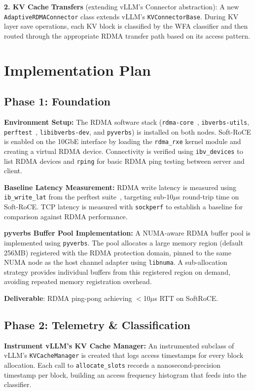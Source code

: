 \documentclass[10pt,letterpaper]{article}
\begin{document}
\textbf{2. KV Cache Transfers} (extending vLLM's Connector abstraction): A new \texttt{AdaptiveRDMAConnector} class extends vLLM's \texttt{KVConnectorBase}. During KV layer save operations, each KV block is classified by the WFA classifier and then routed through the appropriate RDMA transfer path based on its access pattern.

\section{Implementation Plan}

\subsection{Phase 1: Foundation}

\textbf{Environment Setup:} The RDMA software stack (\texttt{rdma-core}~\cite{rdma-core}, \texttt{ibverbs-utils}, \texttt{perftest}~\cite{perftest}, \texttt{libibverbs-dev}, and \texttt{pyverbs}) is installed on both nodes. Soft-RoCE is enabled on the 10GbE interface by loading the \texttt{rdma\_rxe} kernel module and creating a virtual RDMA device. Connectivity is verified using \texttt{ibv\_devices} to list RDMA devices and \texttt{rping} for basic RDMA ping testing between server and client.

\textbf{Baseline Latency Measurement:} RDMA write latency is measured using \texttt{ib\_write\_lat} from the perftest suite~\cite{perftest}, targeting sub-10$\mu$s round-trip time on Soft-RoCE. TCP latency is measured with \texttt{sockperf} to establish a baseline for comparison against RDMA performance.

\textbf{pyverbs Buffer Pool Implementation:} A NUMA-aware RDMA buffer pool is implemented using \texttt{pyverbs}. The pool allocates a large memory region (default 256MB) registered with the RDMA protection domain, pinned to the same NUMA node as the host channel adapter using \texttt{libnuma}. A sub-allocation strategy provides individual buffers from this registered region on demand, avoiding repeated memory registration overhead.

\textbf{Deliverable}: RDMA ping-pong achieving $<$10$\mu$s RTT on SoftRoCE.

\subsection{Phase 2: Telemetry \& Classification}

\textbf{Instrument vLLM's KV Cache Manager:} An instrumented subclass of vLLM's \texttt{KVCacheManager} is created that logs access timestamps for every block allocation. Each call to \texttt{allocate\_slots} records a nanosecond-precision timestamp per block, building an access frequency histogram that feeds into the classifier.
\end{document}
